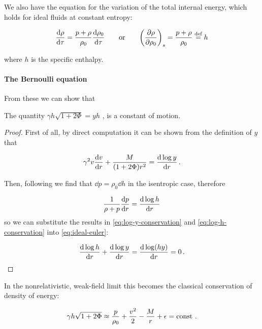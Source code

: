 \documentclass[main.tex]{subfiles}
\begin{document}
We also have the equation for the variation of the total internal energy, which holds for ideal fluids at constant entropy:

\begin{equation} \label{eq:enthalpy-definition}
    \dv{\rho}{\tau} = \frac{p+\rho}{\rho_0} \dv{\rho_0}{\tau}
    \qquad
    \text{or}
    \qquad
    \qty(\pdv{\rho}{\rho_0})_s = \frac{p + \rho}{\rho_0} \defeq h
\end{equation}

where $h$ is the specific enthalpy.

\paragraph{The Bernoulli equation}

From these we can show that

\begin{claim}
  The quantity $\gamma h \sqrt{1+2\Phi} = yh$ , is a constant of motion.
\end{claim}

\begin{proof}
First of all, by direct computation it can be shown from the definition of \(y\) that

\begin{equation} \label{eq:log-y-conservation}
  \gamma^2 v \dv{v}{r} + \frac{M}{(1+ 2 \Phi) r^2} = \dv{\log y }{r} \,.
\end{equation}

Then, following \textcite[section 6.3]{Gourgoulhon:2006bn} we find that \(\dd{p} = \rho_0 \dd{h}\) in the isentropic case, therefore

\begin{equation} \label{eq:log-h-conservation}
  \frac{1}{\rho + p} \dv{p}{r}  =  \dv{\log h}{r}
\end{equation}
so we can substitute the results in \eqref{eq:log-y-conservation} and \eqref{eq:log-h-conservation} into \eqref{eq:ideal-euler}:

\begin{equation}
  \dv{\log h}{r} + \dv{\log y }{r} = \dv{\log (hy) }{r} = 0 \,.
\end{equation}
\end{proof}

In the nonrelativistic, weak-field limit this becomes the classical conservation of density of energy:

\begin{equation}
    \gamma h \sqrt{1+2\Phi} \approx \frac{p}{\rho_0} + \frac{v^2}{2} - \frac{M}{r} + \epsilon = \const \,.
\end{equation}
\end{document}
